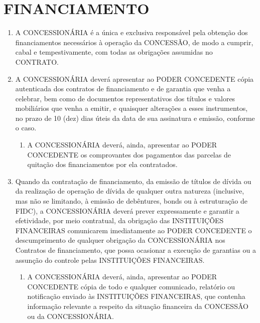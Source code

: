 \documentclass[a4paper,11pt]{report} %
\begin{document}
\section{FINANCIAMENTO}
\label{sec:GRNZ}

\begin{enumerate}
\item \label{itmHDYV:}	A CONCESSIONÁRIA é a única e exclusiva responsável pela obtenção dos financiamentos necessários à operação da CONCESSÃO, de modo a cumprir, cabal e tempestivamente, com todas as obrigações assumidas no CONTRATO.

\item \label{itm:SP3U}	A CONCESSIONÁRIA deverá apresentar ao PODER CONCEDENTE cópia autenticada dos contratos de financiamento e de garantia que venha a celebrar, bem como de documentos representativos dos títulos e valores mobiliários que venha a emitir, e quaisquer alterações a esses instrumentos, no prazo de 10 (dez) dias úteis da data de sua assinatura e emissão, conforme o caso.

\begin{enumerate}[label*=\arabic*.]
\item \label{itm:YCT4}	A CONCESSIONÁRIA deverá, ainda, apresentar ao PODER CONCEDENTE os comprovantes dos pagamentos das parcelas de quitação dos financiamentos por ela contratados.
\end{enumerate}

\item \label{itm:LTYY}	Quando da contratação de financiamento, da emissão de títulos de dívida ou da realização de operação de dívida de qualquer outra natureza (inclusive, mas não se limitando, à emissão de debêntures, bonds ou à estruturação de FIDC), a CONCESSIONÁRIA deverá prever expressamente e garantir a efetividade, por meio contratual, da obrigação das INSTITUIÇÕES FINANCEIRAS comunicarem imediatamente ao PODER CONCEDENTE o descumprimento de qualquer obrigação da CONCESSIONÁRIA nos Contratos de financiamento, que possa ocasionar a execução de garantias ou a assunção do controle pelas INSTITUIÇÕES FINANCEIRAS.

\begin{enumerate}[label*=\arabic*.]
\item \label{itm:LZEN}	A CONCESSIONÁRIA deverá, ainda, apresentar ao PODER CONCEDENTE cópia de todo e qualquer comunicado, relatório ou notificação enviado às INSTITUIÇÕES FINANCEIRAS, que contenha informação relevante a respeito da situação financeira da CONCESSÃO ou da CONCESSIONÁRIA.
\end{enumerate}


\end{enumerate}
\end{document}
